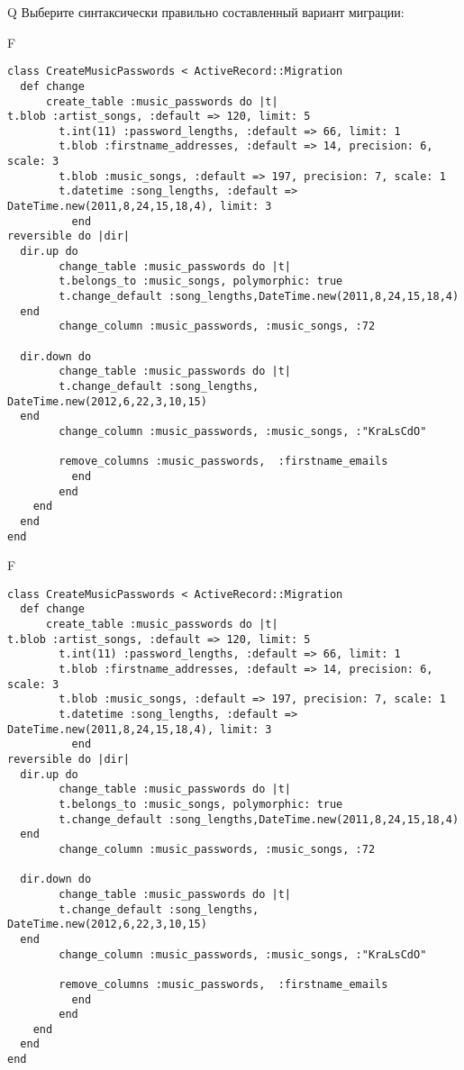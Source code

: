 Q
Выберите синтаксически правильно составленный вариант миграции:

F
\begin{verbatim}
class CreateMusicPasswords < ActiveRecord::Migration
  def change
	  create_table :music_passwords do |t|
t.blob :artist_songs, :default => 120, limit: 5
		t.int(11) :password_lengths, :default => 66, limit: 1
		t.blob :firstname_addresses, :default => 14, precision: 6, scale: 3
		t.blob :music_songs, :default => 197, precision: 7, scale: 1
		t.datetime :song_lengths, :default => DateTime.new(2011,8,24,15,18,4), limit: 3
		  end
reversible do |dir|
  dir.up do
		change_table :music_passwords do |t|
		t.belongs_to :music_songs, polymorphic: true
 		t.change_default :song_lengths,DateTime.new(2011,8,24,15,18,4)
  end
 		change_column :music_passwords, :music_songs, :72
   
  dir.down do
		change_table :music_passwords do |t|
		t.change_default :song_lengths, DateTime.new(2012,6,22,3,10,15)
  end
 		change_column :music_passwords, :music_songs, :"KraLsCdO"
   
		remove_columns :music_passwords,  :firstname_emails 
	      end
	    end
    end 
  end
end

\end{verbatim}

F
\begin{verbatim}
class CreateMusicPasswords < ActiveRecord::Migration
  def change
	  create_table :music_passwords do |t|
t.blob :artist_songs, :default => 120, limit: 5
		t.int(11) :password_lengths, :default => 66, limit: 1
		t.blob :firstname_addresses, :default => 14, precision: 6, scale: 3
		t.blob :music_songs, :default => 197, precision: 7, scale: 1
		t.datetime :song_lengths, :default => DateTime.new(2011,8,24,15,18,4), limit: 3
		  end
reversible do |dir|
  dir.up do
		change_table :music_passwords do |t|
		t.belongs_to :music_songs, polymorphic: true
 		t.change_default :song_lengths,DateTime.new(2011,8,24,15,18,4)
  end
 		change_column :music_passwords, :music_songs, :72
   
  dir.down do
		change_table :music_passwords do |t|
		t.change_default :song_lengths, DateTime.new(2012,6,22,3,10,15)
  end
 		change_column :music_passwords, :music_songs, :"KraLsCdO"
   
		remove_columns :music_passwords,  :firstname_emails 
	      end
	    end
    end 
  end
end

\end{verbatim}

